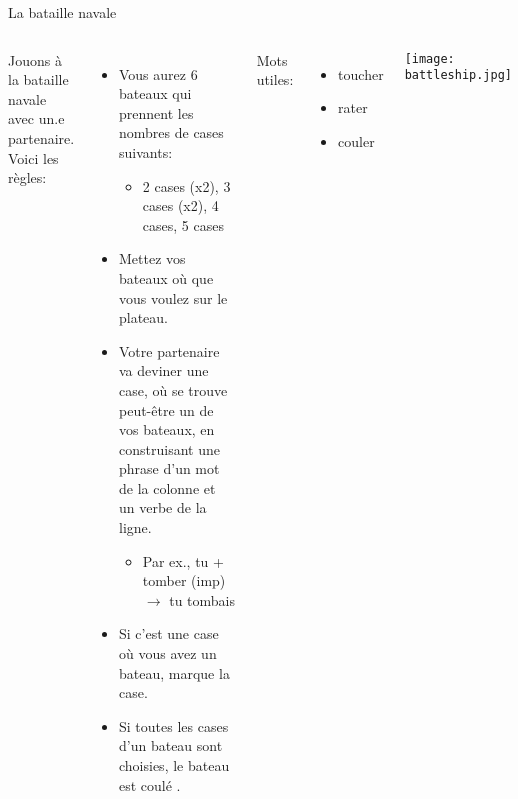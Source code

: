 \begin{frame}{La bataille navale}
  \scriptsize
    \begin{columns}
        Jouons à la bataille navale avec un.e partenaire.
        Voici les règles:
        \begin{itemize}
          \item Vous aurez 6 bateaux qui prennent les nombres de cases  suivants:
          \begin{itemize}
            \scriptsize
            \item 2 cases (x2), 3 cases (x2), 4 cases, 5 cases
          \end{itemize}
          \item Mettez vos bateaux où que  vous voulez sur le plateau.
          \item Votre partenaire va deviner une case, où se trouve peut-être un de vos bateaux, en construisant une phrase d'un mot de la colonne et un verbe de la ligne.
          \begin{itemize}
            \scriptsize
            \item Par ex., tu + tomber (imp) $\to$ tu tombais
          \end{itemize}
          \item Si c'est une case où vous avez un bateau, marque la case.
          \item Si toutes les cases d'un bateau sont choisies, le bateau est coulé .
          \end{itemize}
        \small
        Mots utiles:
        \begin{itemize}
          \item toucher 
          \item rater 
          \item couler 
        \end{itemize}
        \texttt{[image: battleship.jpg]}
    \end{columns}
\end{frame}
